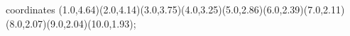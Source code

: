 					coordinates { (1.0,4.64)(2.0,4.14)(3.0,3.75)(4.0,3.25)(5.0,2.86)(6.0,2.39)(7.0,2.11)(8.0,2.07)(9.0,2.04)(10.0,1.93)};